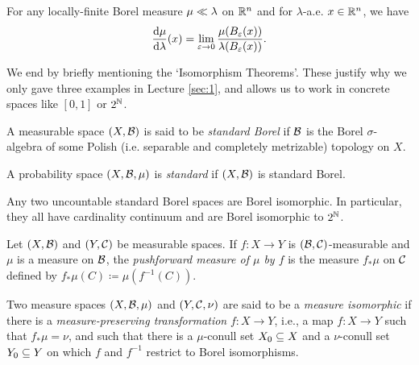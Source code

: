 \documentclass[reqno, twoside]{article}
\begin{document}
    \begin{corollary}
        For any locally-finite Borel measure $\mu\ll\lambda$ on $\mathbb{R}^n$ and for $\lambda$-a.e. $x\in\mathbb{R}^n$, we have
        \vspace{-0.05in}
        \begin{equation*}
            \frac{\d\mu}{\d\lambda}(x)=\lim_{\epsilon\to0}\frac{\mu(B_\epsilon(x))}{\lambda(B_\epsilon(x))}.
            \vspace{-0.05in}
        \end{equation*}
    \end{corollary}

    We end by briefly mentioning the `Isomorphism Theorems'. These justify why we only gave three examples in Lecture \ref{sec:1}, and allows us to work in concrete spaces like $[0,1]$ or $2^{\mathbb{N}}$.

    \begin{definition}
        A measurable space $(X,\mathcal{B})$ is said to be \textit{standard Borel} if $\mathcal{B}$ is the Borel $\sigma$-algebra of some Polish (i.e. separable and completely metrizable) topology on $X$.

        A probability space $(X,\mathcal{B},\mu)$ is \textit{standard} if $(X,\mathcal{B})$ is standard Borel.
    \end{definition}

    \begin{theorem}\label{thm:borel_isomorphism_theorem}
        Any two uncountable standard Borel spaces are Borel isomorphic. In particular, they all have cardinality continuum and are Borel isomorphic to $2^{\mathbb{N}}$.
    \end{theorem}

    \begin{definition}
        Let $(X,\mathcal{B})$ and $(Y,\mathcal{C})$ be measurable spaces. If $f:X\to Y$ is $(\mathcal{B},\mathcal{C})$-measurable and $\mu$ is a measure on $\mathcal{B}$, the \textit{pushforward measure of $\mu$ by $f$} is the measure $f_\ast\mu$ on $\mathcal{C}$ defined by $f_\ast\mu(C)\coloneqq\mu(f^{-1}(C))$.
    \end{definition}

    \begin{definition}
        Two measure spaces $(X,\mathcal{B},\mu)$ and $(Y,\mathcal{C},\nu)$ are said to be a \textit{measure isomorphic} if there is a \textit{measure-preserving transformation} $f:X\to Y$, i.e., a map $f:X\to Y$ such that $f_\ast\mu=\nu$, and such that there is a $\mu$-conull set $X_0\subseteq X$ and a $\nu$-conull set $Y_0\subseteq Y$ on which $f$ and $f^{-1}$ restrict to Borel isomorphisms.
    \end{definition}
\end{document}
